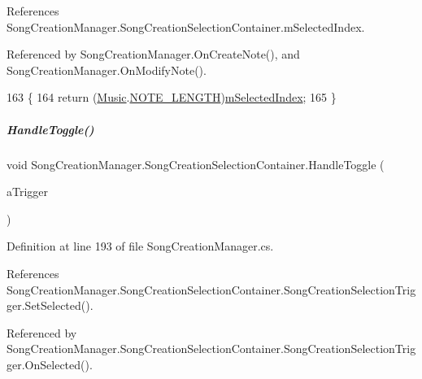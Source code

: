 References Song\+Creation\+Manager.\+Song\+Creation\+Selection\+Container.\+m\+Selected\+Index.



Referenced by Song\+Creation\+Manager.\+On\+Create\+Note(), and Song\+Creation\+Manager.\+On\+Modify\+Note().


\begin{DoxyCode}
163         \{
164             \textcolor{keywordflow}{return} (\hyperlink{class_music}{Music}.\hyperlink{group___music_enums_gaf11b5f079adbb21c800b9eca1c5c3cbd}{NOTE\_LENGTH})\hyperlink{group___s_c_m_nest_class_a1684b25b3eb0e87f189996de22bf9792}{mSelectedIndex};
165         \}
\end{DoxyCode}
\mbox{\label{group___s_c_m_nest_class_a534fec983fb7e5a7f948513672aa64b4}} 
\subparagraph{\texorpdfstring{Handle\+Toggle()}{HandleToggle()}}
{\footnotesize\ttfamily void Song\+Creation\+Manager.\+Song\+Creation\+Selection\+Container.\+Handle\+Toggle (\begin{DoxyParamCaption}\item[{\hyperlink{group___s_c_m_nest_class_class_song_creation_manager_1_1_song_creation_selection_container_1_1_song_creation_selection_trigger}{Song\+Creation\+Selection\+Trigger}}]{a\+Trigger }\end{DoxyParamCaption})\hspace{0.3cm}{\ttfamily [private]}}



Definition at line 193 of file Song\+Creation\+Manager.\+cs.



References Song\+Creation\+Manager.\+Song\+Creation\+Selection\+Container.\+Song\+Creation\+Selection\+Trigger.\+Set\+Selected().



Referenced by Song\+Creation\+Manager.\+Song\+Creation\+Selection\+Container.\+Song\+Creation\+Selection\+Trigger.\+On\+Selected().



